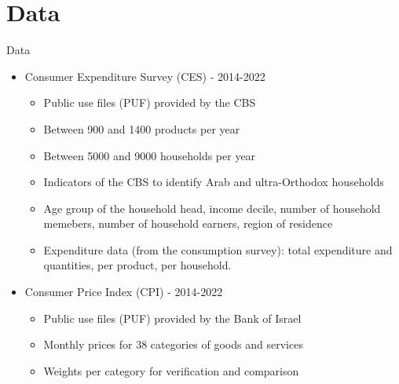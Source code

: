 \documentclass[10pt]{beamer}
\begin{document}
\section{Data}
\begin{frame}{Data}
	\begin{itemize}
		\item    Consumer Expenditure Survey (CES) - 2014-2022
		      \begin{itemize}
			      \item Public use files (PUF) provided by the CBS
			      \item Between 900 and 1400 products per year
			      \item Between 5000 and 9000 households per year
			      \item Indicators of the CBS to identify Arab and ultra-Orthodox households
			      \item Age group of the household head, income decile, number of household memebers, number of household earners, region of residence
			      \item Expenditure data (from the consumption survey): total expenditure and quantities, per product, per household.
		      \end{itemize}

		\item Consumer Price Index (CPI) - 2014-2022
		      \begin{itemize}
			      \item Public use files (PUF) provided by the Bank of Israel
			      \item Monthly prices for 38 categories of goods and services
			      \item Weights per category for verification and comparison
		      \end{itemize}
	\end{itemize}
\end{frame}
\end{document}
